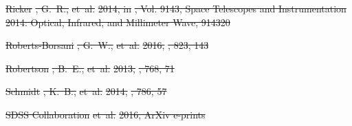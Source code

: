 \documentclass[numberedappendix]{emulateapj}
\providecommand{\DIFdel}[1]{{\protect\color{red}\sout{#1}}}                      %
\begin{document}
\DIFdel{Ricker}%
\DIFdel{, G.~R., }%
\DIFdel{et~al.}%
\DIFdel{2014, in }%
\DIFdel{, Vol. 9143, Space Telescopes and
  Instrumentation 2014: Optical, Infrared, and Millimeter Wave, 914320
}%

\DIFdel{Roberts-Borsani}%
\DIFdel{, G.~W., }%
\DIFdel{et~al.}%
\DIFdel{2016, }%
\DIFdel{, 823, 143
}%

\DIFdel{Robertson}%
\DIFdel{, B.~E., }%
\DIFdel{et~al.}%
\DIFdel{2013, }%
\DIFdel{, 768, 71
}%

\DIFdel{Schmidt}%
\DIFdel{, K.~B., }%
\DIFdel{et~al.}%
\DIFdel{2014, }%
\DIFdel{, 786, 57
}%

\DIFdel{SDSS Collaboration}%
\DIFdel{et~al.}%
\DIFdel{2016, ArXiv e-prints
}%
\end{document}
